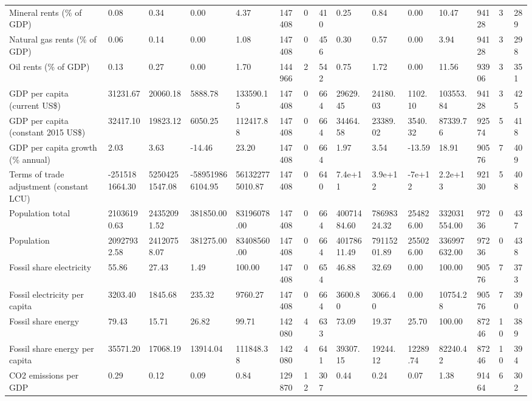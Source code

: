 \begin{longtable}{lllllllllllllll}
\addlinespace
Mineral rents (\% of GDP) & 0.08 & 0.34 & 0.00 & 4.37 & 147408 & 0 & 410 & 0.25 & 0.84 & 0.00 & 10.47 & 94128 & 3 & 289\\
Natural gas rents (\% of GDP) & 0.06 & 0.14 & 0.00 & 1.08 & 147408 & 0 & 456 & 0.30 & 0.57 & 0.00 & 3.94 & 94128 & 3 & 298\\
Oil rents (\% of GDP) & 0.13 & 0.27 & 0.00 & 1.70 & 144966 & 2 & 542 & 0.75 & 1.72 & 0.00 & 11.56 & 93906 & 3 & 351\\
GDP per capita (current US\$) & 31231.67 & 20060.18 & 5888.78 & 133590.15 & 147408 & 0 & 664 & 29629.45 & 24180.03 & 1102.10 & 103553.84 & 94128 & 3 & 425\\
GDP per capita (constant 2015 US\$) & 32417.10 & 19823.12 & 6050.25 & 112417.88 & 147408 & 0 & 664 & 34464.58 & 23389.02 & 3540.32 & 87339.76 & 92574 & 5 & 418\\
\addlinespace
GDP per capita growth (\% annual) & 2.03 & 3.63 & -14.46 & 23.20 & 147408 & 0 & 664 & 1.97 & 3.54 & -13.59 & 18.91 & 90576 & 7 & 409\\
Terms of trade adjustment (constant LCU) & -2515181664.30 & 52504251547.08 & -589519866104.95 & 561322775010.87 & 147408 & 0 & 640 & 7.4e+11 & 3.9e+12 & -7e+12 & 2.2e+13 & 92130 & 5 & 408\\
Population total & 21036190.63 & 24352091.52 & 381850.00 & 83196078.00 & 147408 & 0 & 664 & 40071484.60 & 78698324.32 & 254826.00 & 332031554.00 & 97236 & 0 & 437\\
Population & 20927932.58 & 24120758.07 & 381275.00 & 83408560.00 & 147408 & 0 & 664 & 40178611.49 & 79115201.89 & 255026.00 & 336997632.00 & 97236 & 0 & 438\\
Fossil share electricity & 55.86 & 27.43 & 1.49 & 100.00 & 147408 & 0 & 654 & 46.88 & 32.69 & 0.00 & 100.00 & 90576 & 7 & 373\\
\addlinespace
Fossil electricity per capita & 3203.40 & 1845.68 & 235.32 & 9760.27 & 147408 & 0 & 664 & 3600.80 & 3066.40 & 0.00 & 10754.28 & 90576 & 7 & 390\\
Fossil share energy & 79.43 & 15.71 & 26.82 & 99.71 & 142080 & 4 & 633 & 73.09 & 19.37 & 25.70 & 100.00 & 87246 & 10 & 389\\
Fossil share energy per capita & 35571.20 & 17068.19 & 13914.04 & 111848.38 & 142080 & 4 & 641 & 39307.15 & 19244.12 & 12289.74 & 82240.42 & 87246 & 10 & 394\\
CO2 emissions per GDP & 0.29 & 0.12 & 0.09 & 0.84 & 129870 & 12 & 307 & 0.44 & 0.24 & 0.07 & 1.38 & 91464 & 6 & 302\\

\end{longtable}
